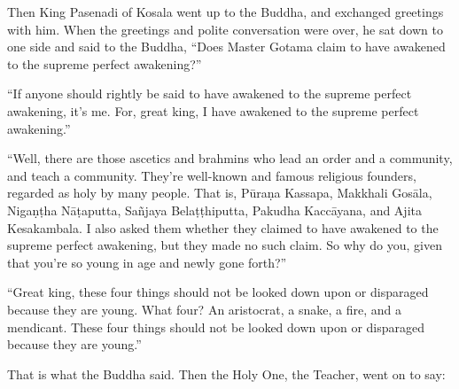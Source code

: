 \documentclass[12pt,openany]{book}%
\begin{document}
Then King Pasenadi of Kosala went up to the Buddha, and exchanged greetings with him. When the greetings and polite conversation were over, he sat down to one side and said to the Buddha, “Does Master Gotama claim to have awakened to the supreme perfect awakening?” 

“If anyone should rightly be said to have awakened to the supreme perfect awakening, it’s me. For, great king, I have awakened to the supreme perfect awakening.” 

“Well, there are those ascetics and brahmins who lead an order and a community, and teach a community. They’re well-known and famous religious founders, regarded as holy by many people. That is, \textsanskrit{Pūraṇa} Kassapa, Makkhali \textsanskrit{Gosāla}, \textsanskrit{Nigaṇṭha} \textsanskrit{Nāṭaputta}, \textsanskrit{Sañjaya} \textsanskrit{Belaṭṭhiputta}, Pakudha \textsanskrit{Kaccāyana}, and Ajita Kesakambala. I also asked them whether they claimed to have awakened to the supreme perfect awakening, but they made no such claim. So why do you, given that you’re so young in age and newly gone forth?” 

“Great king, these four things should not be looked down upon or disparaged because they are young. What four? An aristocrat, a snake, a fire, and a mendicant. These four things should not be looked down upon or disparaged because they are young.” 

That is what the Buddha said. Then the Holy One, the Teacher, went on to say: 
\end{document}
